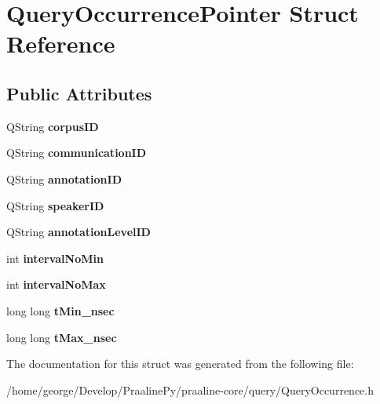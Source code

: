 \hypertarget{struct_query_occurrence_pointer}{}\section{Query\+Occurrence\+Pointer Struct Reference}
\label{struct_query_occurrence_pointer}
\subsection*{Public Attributes}
\begin{DoxyCompactItemize}
\item 
\mbox{\label{struct_query_occurrence_pointer_a62e1e4a874de6e49c805ca7cbea29848}} 
Q\+String {\bfseries corpus\+ID}
\item 
\mbox{\label{struct_query_occurrence_pointer_a60a01f106848abfb09cc09d20bc268d6}} 
Q\+String {\bfseries communication\+ID}
\item 
\mbox{\label{struct_query_occurrence_pointer_a93a3f50d59edfcd23bc9933064998931}} 
Q\+String {\bfseries annotation\+ID}
\item 
\mbox{\label{struct_query_occurrence_pointer_ade78546ab393388bdf1b09fc3a9438cb}} 
Q\+String {\bfseries speaker\+ID}
\item 
\mbox{\label{struct_query_occurrence_pointer_a1deac2467f0e1806e87aca2d00684573}} 
Q\+String {\bfseries annotation\+Level\+ID}
\item 
\mbox{\label{struct_query_occurrence_pointer_ade49073097722cf48617ce80104e79ff}} 
int {\bfseries interval\+No\+Min}
\item 
\mbox{\label{struct_query_occurrence_pointer_ae0137ea662bb774bdc27b952cc8991e8}} 
int {\bfseries interval\+No\+Max}
\item 
\mbox{\label{struct_query_occurrence_pointer_a489ec64c52605fde603bb8f5458d4b99}} 
long long {\bfseries t\+Min\+\_\+nsec}
\item 
\mbox{\label{struct_query_occurrence_pointer_ad79ab3192ef307014e88d9f711accba0}} 
long long {\bfseries t\+Max\+\_\+nsec}
\end{DoxyCompactItemize}


The documentation for this struct was generated from the following file\+:\begin{DoxyCompactItemize}
\item 
/home/george/\+Develop/\+Praaline\+Py/praaline-\/core/query/Query\+Occurrence.\+h\end{DoxyCompactItemize}
